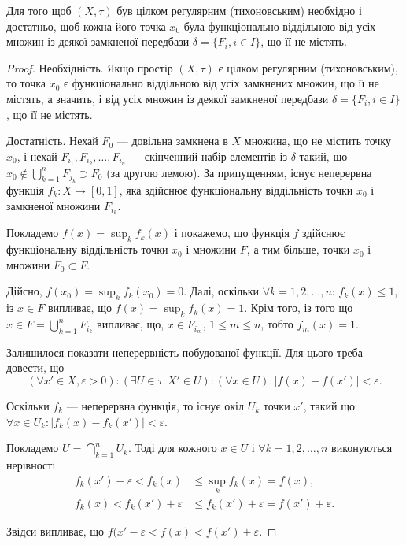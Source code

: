\documentclass[a4paper, 12pt]{article}
\renewcommand{\epsilon}{\varepsilon}
\begin{document}
\begin{theorem}
	Для того щоб $(X, \tau)$ був цілком регулярним (тихоновським)
	необхідно і достатньо, щоб кожна його точка $x_0$ була
	функціонально віддільною від усіх множин із деякої
	замкненої передбази $\delta = \{F_i, i \in I\}$, що її не містять.
\end{theorem}

\begin{proof}
	Необхідність. Якщо простір $(X, \tau)$ є
	цілком регулярним (тихоновським), то точка $x_0$ є
	функціонально віддільною від усіх замкнених множин, що її
	не містять, а значить, і від усіх множин із деякої замкненої
	передбази $\delta = \{F_i, i \in I\}$, що її не містять. \smallskip

	Достатність. Нехай $F_0$ --- довільна замкнена в $X$
	множина, що не містить точку $x_0$, і нехай $F_{i_1}, F_{i_2}, \ldots, F_{i_n}$ ---
	скінченний набір елементів із $\delta$ такий, що
	$x_0 \notin \bigcup_{k = 1}^n F_{j_k} \supset F_0$ (за другою лемою).
	За припущенням, існує неперервна функція $f_k: X \to [0, 1]$, яка здійснює
	функціональну віддільність точки $x_0$ і замкненої множини
	$F_{i_k}$. \smallskip

	Покладемо $f(x) = \sup_k f_k(x)$ і покажемо, що функція $f$
	здійснює функціональну віддільність точки $x_0$ і множини
	$F$, а тим більше, точки $x_0$ і множини $F_0 \subset F$. \smallskip

	Дійсно, $f(x_0) = \sup_k f_k(x_0) = 0$. Далі, оскільки
	$\forall k = 1, 2, \ldots, n$: $f_k(x) \le 1$, із $x \in F$ випливає, що
	$f(x) = \sup_k f_k(x) = 1$. Крім того, із того що 
	$x \in F = \bigcup_{k = 1}^n F_{i_k}$
	випливає, що, $x \in F_{i_m}$, $1 \le m \le n$, тобто $f_m(x) = 1$. \smallskip

	Залишилося показати неперервність побудованої функції.
	Для цього треба довести, що \[ (\forall x' \in X, \epsilon > 0): (\exists U \in \tau: X' \in U): (\forall x \in U): |f(x) - f(x')| < \epsilon. \]
	
	Оскільки $f_k$ --- неперервна функція, то існує окіл $U_k$ точки $x'$, такий що
	$\forall x \in U_k: |f_k(x) - f_k(x')| < \epsilon$. \smallskip

	Покладемо
	$U = \bigcap_{k = 1}^n U_k$. Тоді для кожного $x \in U$ і 
	$\forall k = 1, 2, \ldots, n$ виконуються нерівності
	\begin{align*}
		f_k(x') - \epsilon < f_k(x) &\le \sup_k f_k(x) = f(x), \\
		f_k(x) < f_k(x') + \epsilon &\le f_k(x') + \epsilon = f(x') + \epsilon.
	\end{align*}

	Звідси випливає, що $f(x' - \epsilon < f(x) < f(x') + \epsilon$. 
\end{proof}
\end{document}
